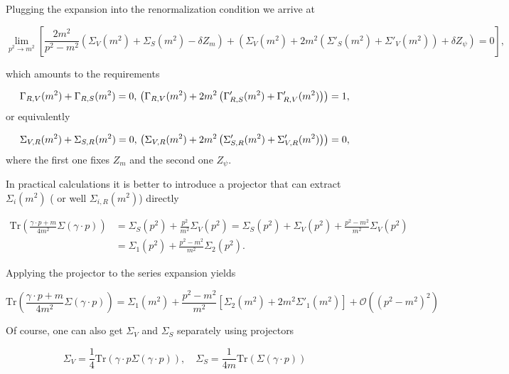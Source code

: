 \documentclass[../FeynCalcManual.tex]{subfiles}
\begin{document}
Plugging the expansion into the renormalization condition we arrive at

\begin{equation}
    \lim_{p^2 \to m^2} \left [ \frac{2m^2}{p^2-m^2} (\Sigma_V(m^2) + \Sigma_S(m^2) - \delta Z_m) + 
    \left ( \Sigma_V(m^2) + 2 m^2 \left ( \Sigma'_S (m^2) + \Sigma'_V (m^2)  \right) + \delta Z_\psi \right ) = 0 \right ],
\end{equation}

which amounts to the requirements

\begin{equation}
        \Gamma_{R,V}(m^2) + \Gamma_{R,S}(m^2)  = 0, \\
        \left ( \Gamma_{R,V}(m^2) + 2 m^2 \left ( \Gamma'_{R,S} (m^2) + \Gamma'_{R,V} (m^2)  \right) \right ) = 1,
\end{equation} or equivalently

\begin{equation}
         \Sigma_{V,R}(m^2) + \Sigma_{S,R}(m^2)  = 0, \\
        \left ( \Sigma_{V,R}(m^2) + 2 m^2 \left ( \Sigma'_{S,R} (m^2) + \Sigma'_{V,R} (m^2)  \right) \right ) = 0,
\end{equation} where the first one fixes \(Z_m\) and the second one
\(Z_\psi\).

In practical calculations it is better to introduce a projector that can
extract \(\Sigma_i(m^2)\) ( or well \(\Sigma_{i,R}(m^2)\)) directly

\begin{align*}
\mathrm{Tr} \left( \frac{\gamma \cdot p+m}{4m^2} \Sigma (\gamma \cdot p) \right ) & = \Sigma_S (p^2) + \frac{p^2}{m^2} \Sigma_V(p^2) = \Sigma_S (p^2) + \Sigma_V(p^2) + \frac{p^2-m^2}{m^2} \Sigma_V(p^2) \\
    &  = \Sigma_1 (p^2) + \frac{p^2-m^2}{m^2} \Sigma_2(p^2).
\end{align*}

Applying the projector to the series expansion yields

\begin{equation}
    \mathrm{Tr} \left( \frac{\gamma \cdot p+m}{4m^2} \Sigma (\gamma \cdot p) \right )  = \Sigma_1(m^2) +
    \frac{p^2-m^2}{m^2}  \left [ \Sigma_2(m^2) + 2 m^2 \Sigma'_1 (m^2)  \right ] + \mathcal{O}((p^2 -m^2)^2)
\end{equation}

Of course, one can also get \(\Sigma_V\) and \(\Sigma_S\) separately
using projectors

\begin{equation}
\Sigma_V = \frac{1}{4} \mathrm{Tr}(\gamma \cdot p \Sigma (\gamma \cdot p)), \quad \Sigma_S = \frac{1}{4 m} \mathrm{Tr}(\Sigma (\gamma \cdot p))
\end{equation}
\end{document}
